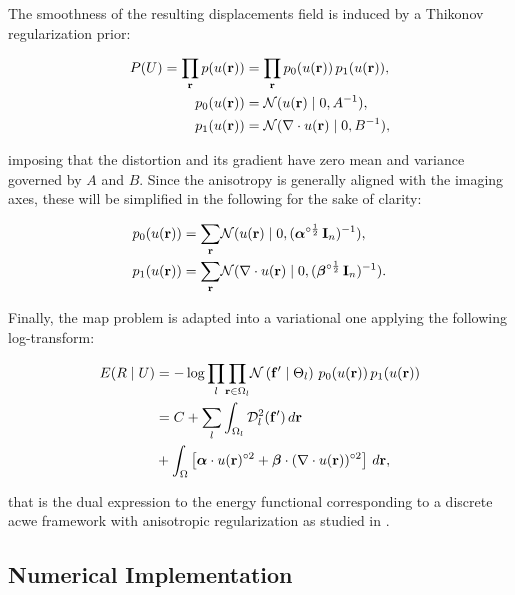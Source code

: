 The smoothness of the resulting displacements field is induced by a Thikonov regularization
  prior:

  \begin{align*}
  P(U) = \underset{\vec{r}}{\prod}\, p(u(\vec{r})) &=
  \underset{\vec{r}}{\prod}\, p_0(u(\vec{r})) \, p_1(u(\vec{r})), \\
  p_0(u(\vec{r})) &= \mathcal{N}( u(\vec{r}) \mid 0, A^{-1}), \notag\\
  p_1(u(\vec{r})) &= \mathcal{N}(  \nabla \cdot u(\vec{r}) \mid 0, B^{-1}),
  \end{align*}

  imposing that the distortion and its gradient have zero
  mean and variance governed by $A$ and $B$.
Since the anisotropy is generally aligned with the imaging axes, these will be simplified
  in the following for the sake of clarity:

  \begin{align}
    p_0(u(\vec{r})) &= \underset{\vec{r}}{\sum} \mathcal{N}( u(\vec{r}) \mid 0,
      (\boldsymbol{\alpha}^{\circ\frac12}\,\vec{I}_n)^{-1}), \notag\\
    p_1(u(\vec{r})) &= \underset{\vec{r}}{\sum} \mathcal{N}( \nabla \cdot u(\vec{r}) \mid 0,
      (\boldsymbol{\beta}^{\circ\frac12}\,\vec{I}_n)^{-1}).
  \label{eq:priors}
  \end{align}


Finally, the \gls{map} problem is adapted into a variational one applying the
  following log-transform:

  \begin{align}
  E(R \mid U) &= -\log \underset{l}{\prod}
  \underset{\vec{r} \in \Omega_l}{\prod}
  \mathcal{N} \left( \vec{f}' \mid \Theta_l \right)\,p_0( u(\vec{r}))\,p_1( u(\vec{r})) \notag\\
  &= C + \underset{l}{\sum} \int_{\Omega_l}
  \mdist{f'}{l} \,d\vec{r} \notag\\
  &+ \int_{\Omega} \left[ \boldsymbol{\alpha} \cdot u(\vec{r})^{\circ2}
  + \boldsymbol{\beta} \cdot (\nabla \cdot u(\vec{r}))^{\circ2} \right] \,d\vec{r},
  \label{eq:energy}
  \end{align}

  that is the dual expression to the energy functional corresponding
  to a discrete \gls*{acwe} framework \citep{chan_active_2001}
  with anisotropic regularization as studied in
  \citep{nagel_investigation_1986}.


\subsection*{Numerical Implementation}
\label{sec:numerical_implementation}

